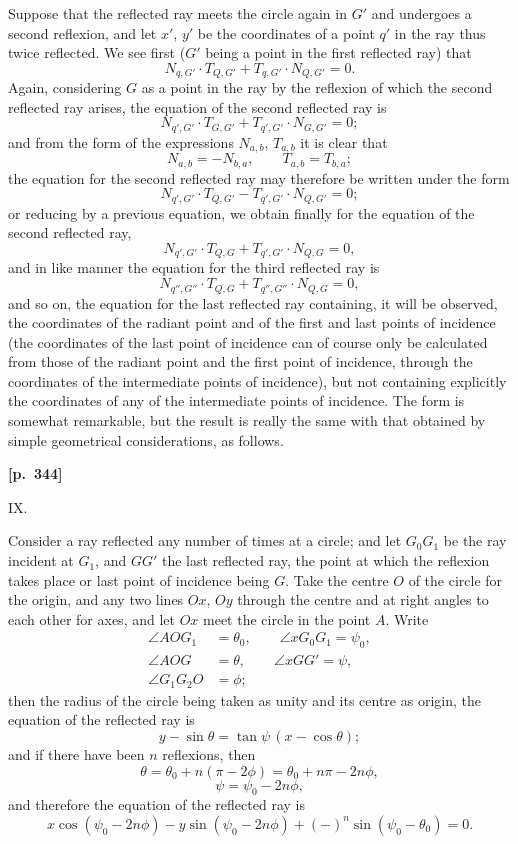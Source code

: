 \documentclass[11pt]{article}
\begin{document}
Suppose that the reflected ray meets the circle again in $G'$ and undergoes a second reflexion, and let $x'$, $y'$ be the coordinates of a point $q'$ in the ray thus twice reflected. We see first ($G'$ being a point in the first reflected ray) that
\[
N_{q,G'}\cdot T_{Q,G'} + T_{q,G'}\cdot N_{Q,G'} = 0.
\]
Again, considering $G$ as a point in the ray by the reflexion of which the second reflected ray arises, the equation of the second reflected ray is
\[
N_{q',G'}\cdot T_{G,G'} + T_{q',G'}\cdot N_{G,G'} = 0;
\]
and from the form of the expressions $N_{a,b}$, $T_{a,b}$ it is clear that
\[
N_{a,b} = -N_{b,a},\qquad T_{a,b} = T_{b,a};
\]
the equation for the second reflected ray may therefore be written under the form
\[
N_{q',G'}\cdot T_{Q,G'} - T_{q',G'}\cdot N_{Q,G'} = 0;
\]
or reducing by a previous equation, we obtain finally for the equation of the second reflected ray,
\[
N_{q',G'}\cdot T_{Q,G} + T_{q',G'}\cdot N_{Q,G} = 0,
\]
and in like manner the equation for the third reflected ray is
\[
N_{q'',G''}\cdot T_{Q,G} + T_{q'',G''}\cdot N_{Q,G} = 0,
\]
and so on, the equation for the last reflected ray containing, it will be observed, the coordinates of the radiant point and of the first and last points of incidence (the coordinates of the last point of incidence can of course only be calculated from those of the radiant point and the first point of incidence, through the coordinates of the intermediate points of incidence), but not containing explicitly the coordinates of any of the intermediate points of incidence. The form is somewhat remarkable, but the result is really the same with that obtained by simple geometrical considerations, as follows.

\medskip
\noindent\textbf{[p.~344]}
\begin{center}IX.\end{center}

Consider a ray reflected any number of times at a circle; and let $G_{0}G_{1}$ be the ray incident at $G_{1}$, and $GG'$ the last reflected ray, the point at which the reflexion takes place or last point of incidence being $G$. Take the centre $O$ of the circle for the origin, and any two lines $Ox$, $Oy$ through the centre and at right angles to each other for axes, and let $Ox$ meet the circle in the point $A$. Write
\begin{align*}
\angle AOG_{1} &= \theta_{0},\qquad \angle xG_{0}G_{1} = \psi_{0},\\
\angle AOG &= \theta,\qquad \angle xGG' = \psi,\\
\angle G_{1}G_{2}O &= \phi;
\end{align*}
then the radius of the circle being taken as unity and its centre as origin, the equation of the reflected ray is
\[
y - \sin\theta = \tan\psi\,(x - \cos\theta);
\]
and if there have been $n$ reflexions, then
\[
\theta = \theta_{0} + n(\pi - 2\phi) = \theta_{0} + n\pi - 2n\phi,
\]
\[
\psi = \psi_{0} - 2n\phi,
\]
and therefore the equation of the reflected ray is
\[
x\cos(\psi_{0}-2n\phi) - y\sin(\psi_{0}-2n\phi) + (-)^{n}\sin(\psi_{0}-\theta_{0}) = 0.
\]
\end{document}
